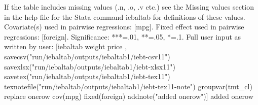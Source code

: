 If the table includes missing values (.n, .o, .v etc.) see the Missing values section in the help file for the Stata command iebaltab for definitions of these values. Covariate(s) used in pairwise regressions: [mpg]. Fixed effect used in pairwise regressions: [foreign]. Significance: ***=.01, **=.05, *=.1. Full user input as written by user: [iebaltab weight price , savecsv("run/iebaltab/outputs/iebaltab1/iebt-csv11") savexlsx("run/iebaltab/outputs/iebaltab1/iebt-xlsx11") savetex("run/iebaltab/outputs/iebaltab1/iebt-tex11") texnotefile("run/iebaltab/outputs/iebaltab1/iebt-tex11-note") groupvar(tmt\_cl) replace onerow cov(mpg) fixed(foreign) addnote("added onerow")] added onerow
